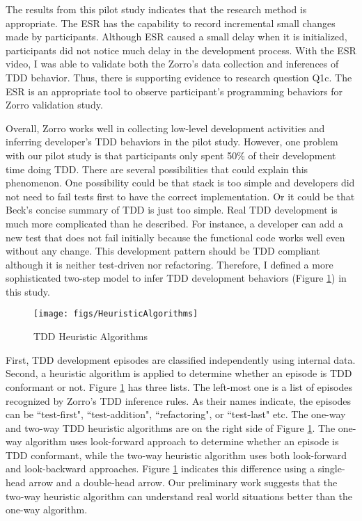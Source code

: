 The results from this pilot study indicates that the research method is
appropriate. The ESR has the capability to record incremental small
changes made by participants. Although ESR caused a small delay
when it is initialized, participants did not notice much
delay in the development process. With the ESR video, I was able to
validate both the Zorro's data collection and inferences of TDD
behavior. Thus, there is supporting evidence to research question
Q1c. The ESR is an appropriate tool to observe participant's
programming behaviors for Zorro validation study.

Overall, Zorro works well in collecting low-level development
activities and inferring developer's TDD behaviors in the pilot
study. However, one problem with our pilot study is that participants
only spent 50\% of their development time doing TDD. There are several
possibilities that could explain this phenomenon. One possibility
could be that stack is too simple and developers did not need to fail
tests first to have the correct implementation. Or it could be that
Beck's concise summary of TDD is just too simple. Real TDD
development is much more complicated than he described. For instance,
a developer can add a new test that does not fail initially because
the functional code works well even without any change. This
development pattern should be TDD compliant although it is neither
test-driven nor refactoring. Therefore, I defined a more sophisticated
two-step model to infer TDD development behaviors (Figure
\ref{fig:heuristic}) in this study.
\begin{figure}[htbp]
  \centering
  \texttt{[image: figs/HeuristicAlgorithms]}
  \caption{TDD Heuristic Algorithms}\label{fig:heuristic}
\end{figure}
First, TDD development episodes are classified independently using
internal data. Second, a heuristic algorithm is applied to determine
whether an episode is TDD conformant or not. Figure
\ref{fig:heuristic} has three lists. The left-most one is a list of
episodes recognized by Zorro's TDD inference rules. As their names
indicate, the episodes can be ``test-first", ``test-addition",
``refactoring", or ``test-last" etc. The one-way and two-way TDD
heuristic algorithms are on the right side of Figure
\ref{fig:heuristic}. The one-way algorithm uses look-forward approach
to determine whether an episode is TDD conformant, while the two-way
heuristic algorithm uses both look-forward and look-backward
approaches. Figure \ref{fig:heuristic} indicates this difference using
a single-head arrow and a double-head arrow. Our preliminary work suggests 
that the two-way heuristic algorithm can understand real world situations
better than the one-way algorithm.

